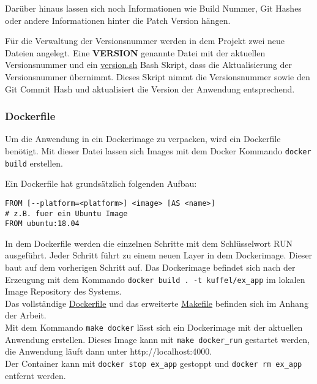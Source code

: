Darüber hinaus lassen sich noch Informationen wie Build Nummer, Git Hashes oder andere Informationen hinter die Patch Version hängen.

Für die Verwaltung der Versionsnummer werden in dem Projekt zwei neue Dateien angelegt.
Eine \textbf{VERSION} genannte Datei mit der aktuellen Versionsnummer und ein \hyperref[lst:projekt_version_sh]{version.sh} Bash Skript, dass die Aktualisierung der Versionsnummer übernimmt.
Dieses Skript nimmt die Versionsnummer sowie den Git Commit Hash und aktualisiert die Version der Anwendung entsprechend.


\subsubsection{Dockerfile}

Um die Anwendung in ein Dockerimage zu verpacken, wird ein Dockerfile benötigt.
Mit dieser Datei lassen sich Images mit dem Docker Kommando \texttt{docker build} erstellen.

Ein Dockerfile hat grundsätzlich folgenden Aufbau:

\lstset{language=bash}
\begin{lstlisting}[frame=htrbl, caption={Aufbau Dockerfile}, label={lst:dockerfile_aufbau}]
FROM [--platform=<platform>] <image> [AS <name>]
# z.B. fuer ein Ubuntu Image
FROM ubuntu:18.04
\end{lstlisting}

In dem Dockerfile werden die einzelnen Schritte mit dem Schlüsselwort RUN ausgeführt.
Jeder Schritt führt zu einem neuen Layer in dem Dockerimage.
Dieser baut auf dem vorherigen Schritt auf.
Das Dockerimage befindet sich nach der Erzeugung mit dem Kommando \texttt{docker build . -t kuffel/ex\_app} im lokalen Image Repository des Systems. \\

Das vollständige \hyperref[lst:dockerfile]{Dockerfile} und das erweiterte \hyperref[lst:makefile]{Makefile} befinden sich im Anhang der Arbeit. \\

Mit dem Kommando \texttt{make docker} lässt sich ein Dockerimage mit der aktuellen Anwendung erstellen.
Dieses Image kann mit \texttt{make docker\_run} gestartet werden, die Anwendung läuft dann unter http://localhost:4000. \\

Der Container kann mit \texttt{docker stop ex\_app} gestoppt und \texttt{docker rm ex\_app} entfernt werden.

